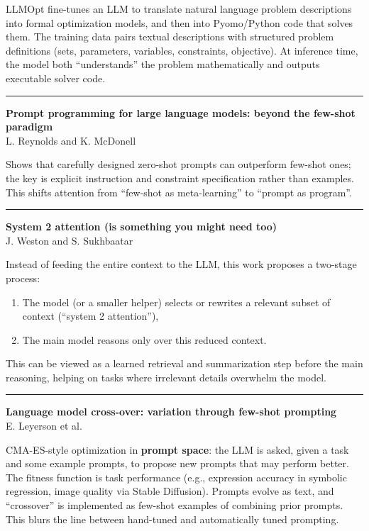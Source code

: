 \documentclass[a5paper]{article}
\providecommand{\tightlist}{%
  \setlength{\itemsep}{0pt}\setlength{\parskip}{0pt}}
\begin{document}
LLMOpt fine-tunes an LLM to translate natural language problem
descriptions into formal optimization models, and then into Pyomo/Python
code that solves them. The training data pairs textual descriptions with
structured problem definitions (sets, parameters, variables,
constraints, objective). At inference time, the model both
``understands'' the problem mathematically and outputs executable solver
code.

\begin{center}\rule{0.5\linewidth}{0.5pt}\end{center}

\textbf{Prompt programming for large language models: beyond the
few-shot paradigm}\\
L. Reynolds and K. McDonell

Shows that carefully designed zero-shot prompts can outperform few-shot
ones; the key is explicit instruction and constraint specification
rather than examples. This shifts attention from ``few-shot as
meta-learning'' to ``prompt as program''.

\begin{center}\rule{0.5\linewidth}{0.5pt}\end{center}

\textbf{System 2 attention (is something you might need too)}\\
J. Weston and S. Sukhbaatar

Instead of feeding the entire context to the LLM, this work proposes a
two-stage process:

\begin{enumerate}
\def\labelenumi{\arabic{enumi}.}
\tightlist
\item
  The model (or a smaller helper) selects or rewrites a relevant subset
  of context (``system 2 attention''),
\item
  The main model reasons only over this reduced context.
\end{enumerate}

This can be viewed as a learned retrieval and summarization step before
the main reasoning, helping on tasks where irrelevant details overwhelm
the model.

\begin{center}\rule{0.5\linewidth}{0.5pt}\end{center}

\textbf{Language model cross-over: variation through few-shot
prompting}\\
E. Leyerson et al.

CMA-ES-style optimization in \textbf{prompt space}: the LLM is asked,
given a task and some example prompts, to propose new prompts that may
perform better. The fitness function is task performance (e.g.,
expression accuracy in symbolic regression, image quality via Stable
Diffusion). Prompts evolve as text, and ``crossover'' is implemented as
few-shot examples of combining prior prompts. This blurs the line
between hand-tuned and automatically tuned prompting.
\end{document}
